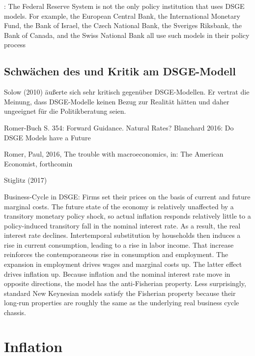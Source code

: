 \textcite[S. 132]{Christiano2018}:
The Federal Reserve System is not the only policy institution that uses DSGE
models. For example, the European Central Bank, the International Monetary
Fund, the Bank of Israel, the Czech National Bank, the Sveriges Riksbank, the Bank
of Canada, and the Swiss National Bank all use such models in their policy process


\subsection{Schwächen des und Kritik am DSGE-Modell}


Solow (2010) äußerte sich sehr kritisch gegenüber DSGE-Modellen. Er vertrat die Meinung, dass 
DSGE-Modelle keinen Bezug zur Realität hätten und daher ungeeignet für die Politikberatung 
seien.

Romer-Buch S. 354: Forward Guidance.
Natural Rates? \textcite[S. 262]{Gali2015}
Blanchard 2016: Do DSGE Models have a Future

Romer, Paul, 2016, The trouble with macroeconomics, in: The American Economist, forthcomin

Stiglitz (2017)





Business-Cycle in DSGE:
Firms set their prices on the basis of current and future marginal
costs. The future state of the economy is relatively unaffected by a transitory monetary
policy shock, so actual inflation responds relatively little to a policy-induced transitory
fall in the nominal interest rate. As a result, the real interest rate declines. Intertemporal
substitution by households then induces a rise in current consumption, leading to a
rise in labor income. That increase reinforces the contemporaneous rise in consumption
and employment. The expansion in employment drives wages and marginal costs
up. The latter effect drives inflation up. Because inflation and the nominal interest rate
move in opposite directions, the model has the anti-Fisherian property. Less surprisingly,
standard New Keynesian models satisfy the Fisherian property because their
long-run properties are roughly the same as the underlying real business cycle chassis.





\section{Inflation}
\label{Inflation}

